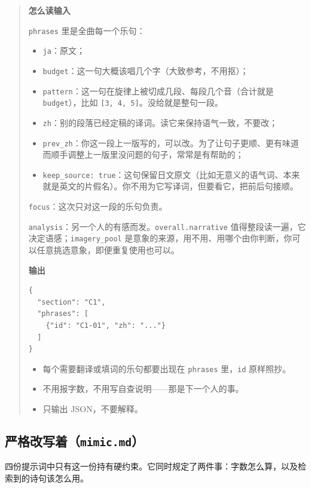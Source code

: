 \documentclass[12pt, a4paper]{ctexart}
\numberwithin{table}{section}
\numberwithin{figure}{section}
\begin{document}
\begin{quote}
\textbf{怎么读输入}\par
\texttt{phrases} 里是全曲每一个乐句：
\begin{itemize}[leftmargin=1.8em,itemsep=2pt,topsep=3pt,parsep=0pt]
  \item \texttt{ja}：原文；
  \item \texttt{budget}：这一句大概该唱几个字（大致参考，不用抠）；
  \item \texttt{pattern}：这一句在旋律上被切成几段、每段几个音（合计就是 \texttt{budget}），比如 \texttt{[3, 4, 5]}。没给就是整句一段。
  \item \texttt{zh}：别的段落已经定稿的译词。读它来保持语气一致，不要改；
  \item \texttt{prev\_zh}：你这一段上一版写的，可以改。为了让句子更顺、更有味道而顺手调整上一版里没问题的句子，常常是有帮助的；
  \item \texttt{keep\_source: true}：这句保留日文原文（比如无意义的语气词、本来就是英文的片假名）。你不用为它写译词，但要看它，把前后句接顺。
\end{itemize}
\texttt{focus}：这次只对这一段的乐句负责。

\texttt{analysis}：另一个人的有感而发。\texttt{overall.narrative} 值得整段读一遍，它决定语感；\texttt{imagery\_pool} 是意象的来源，用不用、用哪个由你判断，你可以任意挑选意象，即便重复使用也可以。

\textbf{输出}\par
\begin{lstlisting}[basicstyle=\ttfamily\footnotesize,frame=single,breaklines=true,numbers=none]
{
  "section": "C1",
  "phrases": [
    {"id": "C1-01", "zh": "..."}
  ]
}
\end{lstlisting}

\begin{itemize}[leftmargin=1.8em,itemsep=2pt,topsep=3pt,parsep=0pt]
  \item 每个需要翻译或填词的乐句都要出现在 \texttt{phrases} 里，\texttt{id} 原样照抄。
  \item 不用报字数，不用写自查说明——那是下一个人的事。
  \item 只输出 JSON，不要解释。
\end{itemize}
\end{quote}

\subsection{严格改写着（\texttt{mimic.md}）}
四份提示词中只有这一份持有硬约束。它同时规定了两件事：字数怎么算，以及检索到的诗句该怎么用。
\end{document}
